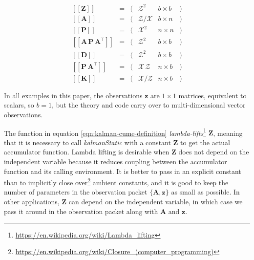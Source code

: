 \documentclass[10pt,oneside,x11names]{article}
\begin{document}
\begin{equation}
\label{eqn:dimensional-breakdown}
\begin{array}{lccccr}
\left[\left[\mathbold{Z}\right]\right]                                       &=& (&\mathcal{Z}^2            & b\times{b}&) \\
\left[\left[\mathbold{A}\right]\right]                                       &=& (&\mathcal{Z}/\mathcal{X}  & b\times{n}&) \\
\left[\left[\mathbold{P}\right]\right]                                       &=& (&\mathcal{X}^2            & n\times{n}&) \\
\left[\left[\mathbold{A}\,\mathbold{P}\,\mathbold{A}^\intercal\right]\right] &=& (&\mathcal{Z}^2            & b\times{b}&) \\
\left[\left[\mathbold{D}\right]\right]                                       &=& (&\mathcal{Z}^2            & b\times{b}&) \\
\left[\left[\mathbold{P}\,\mathbold{A}^\intercal\right]\right]               &=& (&\mathcal{X}\,\mathcal{Z} & n\times{b}&) \\
\left[\left[\mathbold{K}\right]\right]                                       &=& (&\mathcal{X}/\mathcal{Z}  & n\times{b}&)
\end{array}
\end{equation}

\noindent In all examples in this paper, the observations \(\mathbold{z}\) are
\(1\times{1}\) matrices, equivalent to scalars, so \(b=1\), but the theory and code
carry over to multi-dimensional vector observations.

The function in equation \ref{eqn:kalman-cume-definition}
\emph{lambda-lifts}\footnote{\url{https://en.wikipedia.org/wiki/Lambda_lifting}} \(\mathbold{Z}\), meaning that it is necessary to call
\emph{kalmanStatic} with a constant \(\mathbold{Z}\) to get the actual accumulator
function. Lambda lifting is desirable when \(\mathbold{Z}\) does not depend on
the independent variable because it reduces coupling between the
accumulator function and its calling environment. It is better to pass in an
explicit constant than to implicitly close over\footnote{\url{https://en.wikipedia.org/wiki/Closure_(computer_programming)}} ambient
constants, and it is good to keep the number of parameters in the observation
packet \(\{\mathbold{A}, \mathbold{z}\}\) as small as possible. In other
applications, \(\mathbold{Z}\) can depend on the independent variable, in which
case we pass it around in the observation packet along with \(\mathbold{A}\) and
\(\mathbold{z}\).
\end{document}
